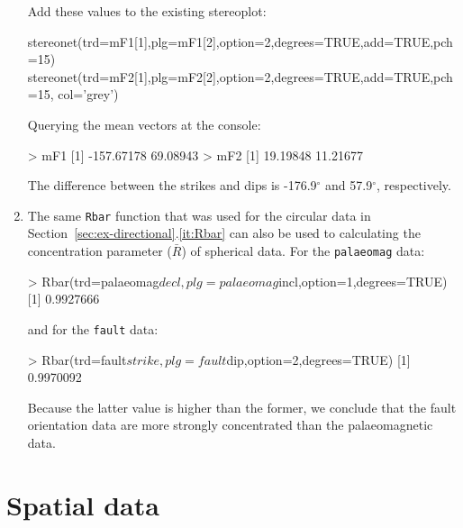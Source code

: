 \begin{enumerate}
Add these values to the existing stereoplot:

\begin{script}[firstnumber=5]
stereonet(trd=mF1[1],plg=mF1[2],option=2,degrees=TRUE,add=TRUE,pch=15)
stereonet(trd=mF2[1],plg=mF2[2],option=2,degrees=TRUE,add=TRUE,pch=15,
          col='grey')
\end{script}

Querying the mean vectors at the console:

\begin{console}
> mF1
[1] -157.67178   69.08943
> mF2
[1] 19.19848 11.21677
\end{console}

The difference between the strikes and dips is -176.9$^\circ$ and
57.9$^\circ$, respectively.

\item The same \texttt{Rbar} function that was used for the circular
  data in Section~\ref{sec:ex-directional}.\ref{it:Rbar} can also be
  used to calculating the concentration parameter ($\bar{R}$) of
  spherical data. For the \texttt{palaeomag} data:

\begin{console}  
> Rbar(trd=palaeomag$decl,plg=palaeomag$incl,option=1,degrees=TRUE)
[1] 0.9927666
\end{console}

\noindent and for the \texttt{fault} data:

\begin{console}  
> Rbar(trd=fault$strike,plg=fault$dip,option=2,degrees=TRUE)
[1] 0.9970092
\end{console}

Because the latter value is higher than the former, we conclude that
the fault orientation data are more strongly concentrated than the
palaeomagnetic data.

\end{enumerate}

\section{Spatial data}
\label{sec:sol-spatial}

